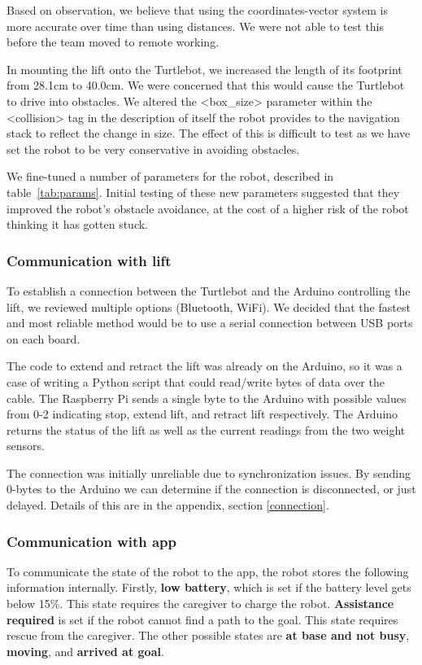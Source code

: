 \documentclass{article}
\begin{document}
Based on observation, we believe that using the coordinates-vector system is more accurate over time than using distances. We were not able to test this before the team moved to remote working. 

In mounting the lift onto the Turtlebot, we increased the length of its footprint from 28.1cm to 40.0cm. We were concerned that this would cause the Turtlebot to drive into obstacles. We altered the <box\_size> parameter within the <collision> tag in the description of itself the robot provides to the navigation stack to reflect the change in size. The effect of this is difficult to test as we have set the robot to be very conservative in avoiding obstacles. 

We fine-tuned a number of parameters for the robot, described in table~\ref{tab:params}. Initial testing of these new parameters suggested that they improved the robot's obstacle avoidance, at the cost of a higher risk of the robot thinking it has gotten stuck.

\subsubsection{Communication with lift}
To establish a connection between the Turtlebot and the Arduino controlling the lift, we reviewed multiple options (Bluetooth, WiFi). We decided that the fastest and most reliable method would be to use a serial connection between USB ports on each board.

The code to extend and retract the lift was already on the Arduino, so it was a case of writing a Python script that could read/write bytes of data over the cable. The Raspberry Pi sends a single byte to the Arduino with possible values from 0-2 indicating stop, extend lift, and retract lift respectively. The Arduino returns the status of the lift as well as the current readings from the two weight sensors.

The connection was initially unreliable due to synchronization issues. By sending 0-bytes to the Arduino we can determine if the connection is disconnected, or just delayed. Details of this are in the appendix, section \ref{connection}.

\subsubsection{Communication with app}
To communicate the state of the robot to the app, the robot stores the following information internally. Firstly, {\bf low battery}, which is set if the battery level gets below 15\%. This state requires the caregiver to charge the robot. {\bf Assistance required} is set if the robot cannot find a path to the goal. This state requires rescue from the caregiver. The other possible states are {\bf at base and not busy}, {\bf moving}, and {\bf arrived at goal}.
\end{document}
